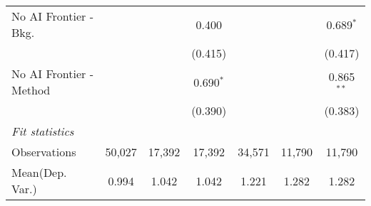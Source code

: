 \begin{tabular}{lcccccc}
   No AI Frontier - Bkg.   &              &         & 0.400       &         &         & 0.689$^{*}$\\   
                           &              &         & (0.415)     &         &         & (0.417)\\   
   No AI Frontier - Method &              &         & 0.690$^{*}$ &         &         & 0.865$^{**}$\\   
                           &              &         & (0.390)     &         &         & (0.383)\\   
   \midrule
   \emph{Fit statistics}\\
   Observations            & 50,027       & 17,392  & 17,392      & 34,571  & 11,790  & 11,790\\  
Mean(Dep. Var.) & 0.994 & 1.042 & 1.042 & 1.221 & 1.282 & 1.282 \\
   

\end{tabular}
